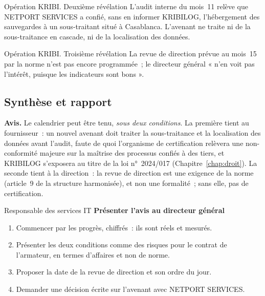 \begin{boxscenario}{Opération KRIBI. Deuxième révélation}
L'audit interne du mois~11 relève que NETPORT SERVICES a confié, sans en
informer KRIBILOG, l'hébergement des sauvegardes à un sous-traitant situé
à Casablanca. L'avenant ne traite ni de la sous-traitance en cascade, ni de
la localisation des données.
\end{boxscenario}

\begin{boxscenario}{Opération KRIBI. Troisième révélation}
La revue de direction prévue au mois~15 par la norme n'est pas encore
programmée~; le directeur général « n'en voit pas l'intérêt, puisque les
indicateurs sont bons ».
\end{boxscenario}

\subsection{Synthèse et rapport}

\textbf{Avis.} Le calendrier peut être tenu, \emph{sous deux conditions}. La
première tient au fournisseur~: un nouvel avenant doit traiter la
sous-traitance et la localisation des données avant l'audit, faute de
quoi l'organisme de certification relèvera une non-conformité majeure sur
la maîtrise des processus confiés à des tiers, et KRIBILOG s'exposera au
titre de la loi n°~2024/017 (Chapitre~\ref{chap:droit}). La seconde tient à
la direction~: la revue de direction est une exigence de la norme
(article~9 de la structure harmonisée), et non une formalité~; sans elle,
pas de certification.

\begin{boxmetier}{Responsable des services IT}
\textbf{Présenter l'avis au directeur général}
\begin{enumerate}
    \item Commencer par les progrès, chiffrés~: ils sont réels et
          mesurés.
    \item Présenter les deux conditions comme des risques pour le contrat
          de l'armateur, en termes d'affaires et non de norme.
    \item Proposer la date de la revue de direction et son ordre du jour.
    \item Demander une décision écrite sur l'avenant avec NETPORT
          SERVICES.
\end{enumerate}
\end{boxmetier}

